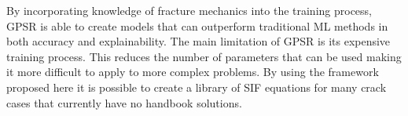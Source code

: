 By incorporating knowledge of fracture mechanics into the training process, GPSR is able to create models that can outperform traditional ML methods in both accuracy and explainability. The main limitation of GPSR is its expensive training process. This reduces the number of parameters that can be used making it more difficult to apply to more complex problems. By using the framework proposed here it is possible to create a library of SIF equations for many crack cases that currently have no handbook solutions.